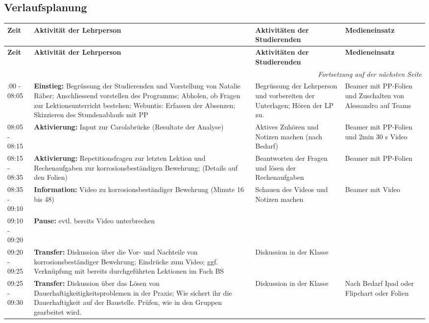 \documentclass[
11pt,
captions=tableheading,
headsepline,
footsepline, 
captions=tableheading,
parskip=half-,
]{scrartcl}
\begin{document}
\begin{landscape}
\subsection{Verlaufsplanung}
\begin{longtable}{@{}l|p{9cm}p{7.5cm}p{3.5cm}@{}}
    \toprule
    \textbf{Zeit} & \textbf{Aktivität der Lehrperson} & \textbf{Aktivitäten der Studierenden} & \textbf{Medieneinsatz} \\
    \midrule
    \endfirsthead
    \toprule
    \textbf{Zeit} & \textbf{Aktivität der Lehrperson} & \textbf{Aktivitäten der Studierenden} & \textbf{Medieneinsatz} \\
    \midrule
    \endhead
    \midrule
    \multicolumn{4}{r}{\textit{Fortsetzung auf der nächsten Seite}} \\
    \midrule
    \endfoot
    \bottomrule
    \endlastfoot
    \midrule
    08:00 - 08:05 & \textbf{Einstieg: }Begrüssung der Studierenden und Vorstellung von Natalie Räber; Anschliessend vorstellen des Programms; Abholen, ob Fragen zur Lektionsunterricht bestehen; Webuntis: Erfassen der Absenzen; Skizzieren des Stundenablaufs mit PP & Begrüssung der Lehrperson und vorbereiten der Unterlagen; Hören der LP zu. & Beamer mit PP-Folien und Zuschalten von Alessandro auf Teams\\
    \midrule
    08:05 - 08:15 & \textbf{Aktivierung: } Input zur Carolabrücke (Resultate der Analyse) & Aktives Zuhören und Notizen machen (nach Bedarf) & Beamer mit PP-Folien und 2min 30 s Video\\
    \midrule
    08:15 - 08:35 & \textbf{Aktivierung:} Repetitionsfragen zur letzten Lektion und Rechenaufgaben zur korrosionsbeständigen Bewehrung; (Details auf den Folien) & Beantworten der Fragen und lösen der Rechenaufgaben  & Beamer mit PP-Folien\\
    \midrule
    08:35 - 09:10 & \textbf{Information:} Video zu korrosionsbeständiger Bewehrung (Minute 16 bis 48) & Schauen des Videos und Notizen machen & Beamer mit Video\\
    \midrule
    09:10 - 09:20 & \textbf{Pause:} evtl. bereits Video unterbrechen {} & {}\\
    \midrule
    09:20 - 09:25 & \textbf{Transfer:} Diskussion über die Vor- und Nachteile von korrosionsbeständiger Bewehrung; Eindrücke zum Video; ggf. Verknüpfung mit bereits durchgeführten Lektionen im Fach BS & Diskussion in der Klasse & {}\\
    \midrule
    09:25 - 09:30 & \textbf{Transfer:} Diskussion über das Lösen von Dauerhaftigkeitigkeitsproblemen in der Praxis; Wie sichert ihr die Dauerhaftigkeit auf der Baustelle. Prüfen, wie in den Gruppen gearbeitet wird. & Diskussion in der Klasse & Nach Bedarf Ipad oder Flipchart oder Folien \\

\end{longtable}
\end{landscape}
\end{document}
